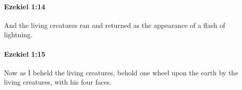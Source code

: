 		\paragraph{Ezekiel 1:14} %
			\label{EZEKIEL-1-14}

			And the living creatures ran and returned as the appearance of a flash of lightning.


		\paragraph{Ezekiel 1:15} %
			\label{EZEKIEL-1-15}

			Now as I beheld the living creatures, behold one wheel upon the earth by the living creatures, with his four faces.



